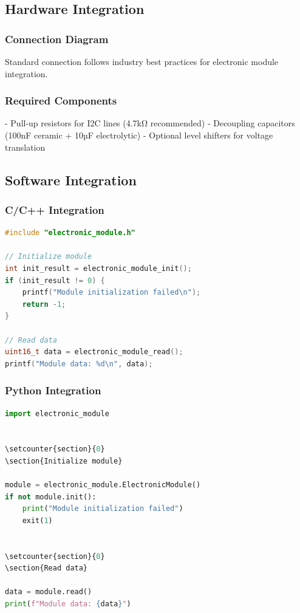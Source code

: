 \documentclass[11pt,a4paper]{article}
\begin{document}
\subsection{Hardware Integration}

\subsubsection{Connection Diagram}

Standard connection follows industry best practices for electronic module integration.

\subsubsection{Required Components}

- Pull-up resistors for I2C lines (4.7kΩ recommended)
- Decoupling capacitors (100nF ceramic + 10µF electrolytic)
- Optional level shifters for voltage translation

\subsection{Software Integration}

\subsubsection{C/C++ Integration}

\begin{lstlisting}[language=c]
#include "electronic_module.h"

// Initialize module
int init_result = electronic_module_init();
if (init_result != 0) {
    printf("Module initialization failed\n");
    return -1;
}

// Read data
uint16_t data = electronic_module_read();
printf("Module data: %d\n", data);
\end{lstlisting}

\subsubsection{Python Integration}

\begin{lstlisting}[language=python]
import electronic_module


\setcounter{section}{0}
\section{Initialize module}

module = electronic_module.ElectronicModule()
if not module.init():
    print("Module initialization failed")
    exit(1)


\setcounter{section}{0}
\section{Read data}

data = module.read()
print(f"Module data: {data}")
\end{lstlisting}
\end{document}
